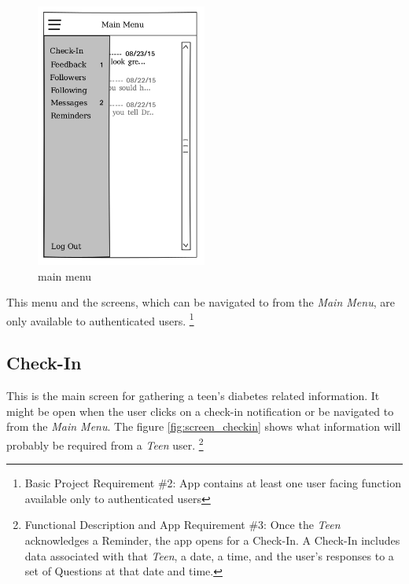\documentclass{article}
\begin{document}
    \begin{figure}[h]
        \centering
        \includegraphics[width=0.5\textwidth,height=\textheight,keepaspectratio]{main.png}
        \caption{main menu}
        \label{fig:screen_main}
    \end{figure}


    This menu and the screens, which can be navigated to from the \emph{Main Menu}, are only available to authenticated users.
    \footnote{Basic Project Requirement \#2: App contains at least one user facing function available only to authenticated users}

\newpage

    \subsection{Check-In}

    This is the main screen for gathering a teen's diabetes related information. It might be open when the user clicks on a check-in notification or be navigated to from the \emph{Main Menu}. The figure \ref{fig:screen_checkin} shows what information will probably be required from a \emph{Teen} user.
    \footnote{Functional Description and App Requirement \#3: Once the \emph{Teen} acknowledges a Reminder, the app opens for a Check-In.  A Check-In includes data associated with that \emph{Teen}, a date, a time, and the user's responses to a set of Questions at that date and time.}
\end{document}
